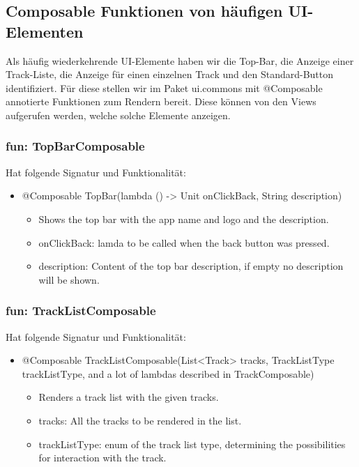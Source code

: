 \documentclass[oneside, ngerman]{sdqtechreport}
\begin{document}
\subsection{Composable Funktionen von häufigen UI-Elementen}

Als häufig wiederkehrende UI-Elemente haben wir die Top-Bar, die Anzeige einer Track-Liste, die Anzeige für einen einzelnen Track und den Standard-Button identifiziert. Für diese stellen wir im Paket ui.commons mit @Composable annotierte Funktionen zum Rendern bereit. Diese können von den Views aufgerufen werden, welche solche Elemente anzeigen.

\subsubsection{fun: TopBarComposable}

Hat folgende Signatur und Funktionalität:
\begin{itemize}
    \item @Composable TopBar(lambda () -> Unit onClickBack, String description)
    \begin{itemize}
        \item Shows the top bar with the app name and logo and the description.
        \item onClickBack: lamda to be called when the back button was pressed.
        \item description: Content of the top bar description, if empty no description will be shown.
    \end{itemize}
\end{itemize}


\subsubsection{fun: TrackListComposable}

Hat folgende Signatur und Funktionalität:
\begin{itemize}
    \item @Composable TrackListComposable(List<Track> tracks, TrackListType trackListType, and a lot of lambdas described in TrackComposable)
    \begin{itemize}
        \item Renders a track list with the given tracks.
        \item tracks: All the tracks to be rendered in the list.
        \item trackListType: enum of the track list type, determining the possibilities for interaction with the track.
    \end{itemize}
\end{itemize}
\end{document}

